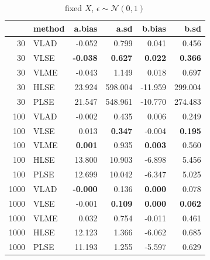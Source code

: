 \documentclass[twoside]{article}
\begin{document}
\begin{table}[ht]
\centering
\caption{fixed $X$, $\epsilon \sim \mathcal{N}(0,1)$}
\begin{tabular}{rlrrrr}
  \hline
 & method & a.bias & a.sd & b.bias & b.sd \\ 
  \hline
  30 & VLAD & -0.052 & 0.799 & 0.041 & 0.456 \\ 
  30 & VLSE & \textbf{-0.038} & \textbf{0.627} & \textbf{0.022} & \textbf{0.366} \\ 
  30 & VLME & -0.043 & 1.149 & 0.018 & 0.697 \\ 
  30 & HLSE & 23.924 & 598.004 & -11.959 & 299.004 \\ 
  30 & PLSE & 21.547 & 548.961 & -10.770 & 274.483 \\ 
   \hline
  100 & VLAD & -0.002 & 0.435 & 0.006 & 0.249 \\ 
  100 & VLSE & 0.013 & \textbf{0.347} & -0.004 & \textbf{0.195} \\ 
  100 & VLME & \textbf{0.001} & 0.935 & \textbf{0.003} & 0.560 \\ 
  100 & HLSE & 13.800 & 10.903 & -6.898 & 5.456 \\ 
  100 & PLSE & 12.699 & 10.042 & -6.347 & 5.025 \\
   \hline
  1000 & VLAD & \textbf{-0.000} & 0.136 & \textbf{0.000} & 0.078 \\ 
  1000 & VLSE & -0.001 & \textbf{0.109} & \textbf{0.000} & \textbf{0.062} \\ 
  1000 & VLME & 0.032 & 0.754 & -0.011 & 0.461 \\ 
  1000 & HLSE & 12.123 & 1.366 & -6.062 & 0.685 \\ 
  1000 & PLSE & 11.193 & 1.255 & -5.597 & 0.629 \\ 
   \hline
\end{tabular}
\end{table}
\end{document}
